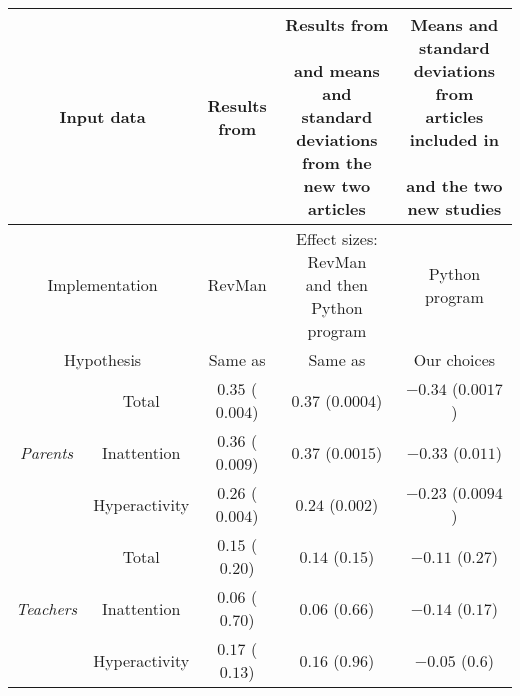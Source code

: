 \begin{tabular}{ ccccc }
\toprule

\multicolumn{2}{c}{Input data} & \shortstack{ Results from \\ \citet{Cortese2016} } & \shortstack{ Results from \\ \citet{Cortese2016} \\ and means and standard \\ deviations from the new two articles } & \shortstack{ Means and standard deviations \\ from articles included in \\ \citet{Cortese2016} \\ and the two new studies }\\
\hline
\multicolumn{2}{c}{Implementation} & \shortstack{ RevMan \\ \citet{RevMan} } & \shortstack{ Effect sizes: RevMan \\ \citet{RevMan} and then \\ Python program } & Python program\\
\hline
\multicolumn{2}{c}{Hypothesis} & Same as \citet{Cortese2016} & Same as \citet{Cortese2016} & Our choices\\
\hline
\multirow{ 3}{*}{ \textit{Parents} } & Total & $0.35$ ($0.004$) & $0.37$ ($0.0004$) & $-0.34$ ($0.0017$) \\
 & Inattention  & $0.36$ ($0.009$) & $0.37$ ($0.0015$) & $-0.33$ ($0.011$)\\
 & Hyperactivity  & $0.26$ ($0.004$) & $0.24$ ($0.002$) & $-0.23$ ($0.0094$)\\
\multirow{ 3}{*}{ \textit{Teachers} } & Total & $0.15$ ($0.20$) & $0.14$ ($0.15$) & $-0.11$ ($0.27$)\\
 & Inattention  & $0.06$ ($0.70$) & $0.06$ ($0.66$) & $-0.14$ ($0.17$)\\
 & Hyperactivity  & $0.17$ ($0.13$) & $0.16$ ($0.96$) & $-0.05$ ($0.6$)\\
\bottomrule
\end{tabular}

